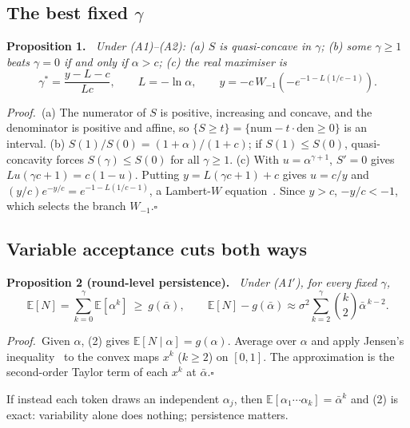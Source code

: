 \documentclass[11pt,letterpaper]{article}
\newenvironment{prop}[1]{\par\vspace{2pt}\noindent\textbf{Proposition #1.}\itshape\ }{\par\vspace{2pt}}
\newcommand{\pf}{\noindent\textit{Proof.}\ }
\newcommand{\qedbox}{\hfill$\square$}
\newcommand{\E}{\mathbb{E}}
\newcommand{\abar}{\bar\alpha}
\begin{document}
\subsection{The best fixed $\gamma$}
\begin{prop}{1}
Under (A1)--(A2): (a) $S$ is quasi-concave in $\gamma$; (b) some $\gamma\ge1$ beats $\gamma=0$ if and only if $\alpha>c$; (c) the real maximiser is
\begin{equation}
\gamma^{*}=\frac{y-L-c}{Lc},\qquad L=-\ln\alpha,\qquad y=-c\,W_{-1}\!\left(-e^{-1-L(1/c-1)}\right).
\end{equation}
\end{prop}
\pf (a) The numerator of $S$ is positive, increasing and concave, and the denominator is positive and affine, so $\{S\ge t\}=\{\text{num}-t\cdot\text{den}\ge0\}$ is an interval. (b) $S(1)/S(0)=(1+\alpha)/(1+c)$; if $S(1)\le S(0)$, quasi-concavity forces $S(\gamma)\le S(0)$ for all $\gamma\ge1$. (c) With $u=\alpha^{\gamma+1}$, $S'=0$ gives $Lu(\gamma c+1)=c(1-u)$. Putting $y=L(\gamma c+1)+c$ gives $u=c/y$ and $(y/c)e^{-y/c}=e^{-1-L(1/c-1)}$, a Lambert-$W$ equation~\cite{corless}. Since $y>c$, $-y/c<-1$, which selects the branch $W_{-1}$.\qedbox

\subsection{Variable acceptance cuts both ways}
\begin{prop}{2 (round-level persistence)}
Under (A1$'$), for every fixed $\gamma$,
\begin{equation}
\E[N]=\sum_{k=0}^{\gamma}\E[\alpha^k]\ \ge\ g(\abar),\qquad \E[N]-g(\abar)\approx\sigma^2\sum_{k=2}^{\gamma}\binom{k}{2}\abar^{\,k-2}.
\end{equation}
\end{prop}
\pf Given $\alpha$, (2) gives $\E[N\mid\alpha]=g(\alpha)$. Average over $\alpha$ and apply Jensen's inequality~\cite{jensen} to the convex maps $x^k$ ($k\ge2$) on $[0,1]$. The approximation is the second-order Taylor term of each $x^k$ at $\abar$.\qedbox

\smallskip
If instead each token draws an independent $\alpha_j$, then $\E[\alpha_1\cdots\alpha_k]=\abar^k$ and (2) is exact: variability alone does nothing; persistence matters.
\end{document}
